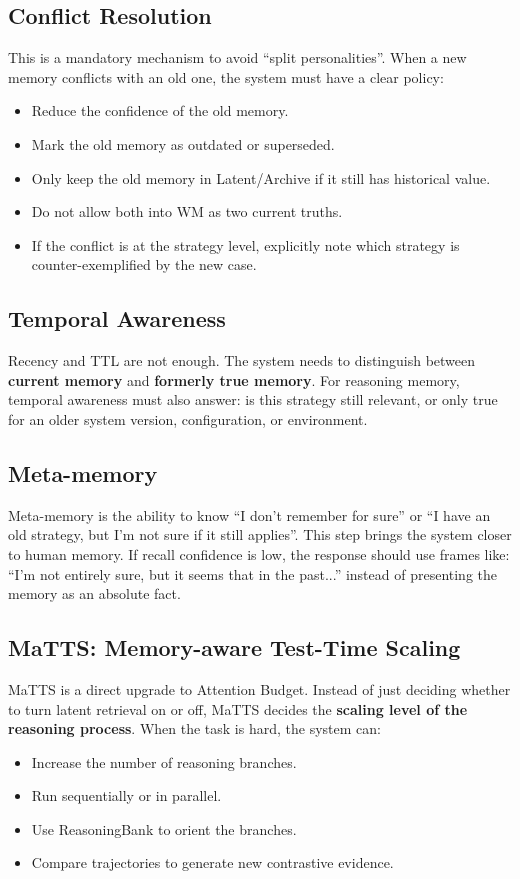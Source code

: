 \documentclass[a4paper,12pt]{article}
\begin{document}
\subsection*{Conflict Resolution}

This is a mandatory mechanism to avoid ``split personalities''. When a new memory conflicts with an old one, the system must have a clear policy:
\begin{itemize}
    \item Reduce the confidence of the old memory.
    \item Mark the old memory as outdated or superseded.
    \item Only keep the old memory in Latent/Archive if it still has historical value.
    \item Do not allow both into WM as two current truths.
    \item If the conflict is at the strategy level, explicitly note which strategy is counter-exemplified by the new case.
\end{itemize}

\subsection*{Temporal Awareness}

Recency and TTL are not enough. The system needs to distinguish between \textbf{current memory} and \textbf{formerly true memory}. For reasoning memory, temporal awareness must also answer: is this strategy still relevant, or only true for an older system version, configuration, or environment.

\subsection*{Meta-memory}

Meta-memory is the ability to know ``I don't remember for sure'' or ``I have an old strategy, but I'm not sure if it still applies''. This step brings the system closer to human memory. If recall confidence is low, the response should use frames like: ``I'm not entirely sure, but it seems that in the past...'' instead of presenting the memory as an absolute fact.

\subsection*{MaTTS: Memory-aware Test-Time Scaling}

MaTTS is a direct upgrade to Attention Budget. Instead of just deciding whether to turn latent retrieval on or off, MaTTS decides the \textbf{scaling level of the reasoning process}. When the task is hard, the system can:
\begin{itemize}
    \item Increase the number of reasoning branches.
    \item Run sequentially or in parallel.
    \item Use ReasoningBank to orient the branches.
    \item Compare trajectories to generate new contrastive evidence.
\end{itemize}
\end{document}
